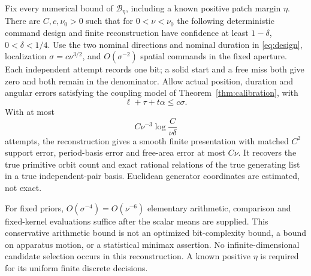\begin{theorem}
\label{thm:constructive}
Fix every numerical bound of $\mathcal B_\eta$, including a known
positive patch margin $\eta$. There are $C,c,\nu_0>0$ such that for
$0<\nu<\nu_0$ the following deterministic command design and finite
reconstruction have confidence at least $1-\delta$, $0<\delta<1/4$.
Use the two nominal directions and nominal duration in \eqref{eq:design},
localization $\sigma=c\nu^{3/2}$, and $O(\sigma^{-2})$ spatial
commands in the fixed aperture. Each independent attempt records one
bit; a solid start and a free miss both give zero and both remain in
the denominator. Allow actual position, duration and angular errors
satisfying the coupling model of Theorem~\ref{thm:calibration}, with
\begin{equation}\label{eq:constructive-calibration}
                    \ell+\tau+t\alpha\le c\sigma.
\end{equation}
With at most
\begin{equation}\label{eq:constructive-attempts}
                  C\nu^{-3}\log\frac{C}{\nu\delta}
\end{equation}
attempts, the reconstruction gives a smooth finite presentation with
matched $C^2$ support error, period-basis error and free-area error at
most $C\nu$. It recovers the true primitive orbit count and exact
rational relations of the true generating list in a true independent-pair
basis. Euclidean generator coordinates are estimated, not exact.

For fixed priors, $O(\sigma^{-4})=O(\nu^{-6})$ elementary arithmetic,
comparison and fixed-kernel evaluations suffice after the scalar means
are supplied. This conservative arithmetic bound is not an optimized
bit-complexity bound, a bound on apparatus motion, or a statistical
minimax assertion. No infinite-dimensional candidate selection occurs
in this reconstruction. A known positive $\eta$ is required for its
uniform finite discrete decisions.
\end{theorem}
